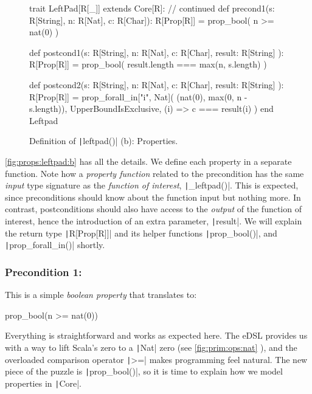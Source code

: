 \documentclass[11pt]{article}
\renewcommand{\vref}[1]{\autoref{#1} \vpageref{#1}}{}
\newcommand{\ScalaI}[1]{\texttt|#1|}
\begin{document}
\begin{figure}[tb]
\begin{ScalaBlock}
trait LeftPad[R[_]] extends Core[R]:
  // continued
  def precond1(s: R[String], n: R[Nat], c: R[Char]): R[Prop[R]] =
    prop_bool( n >= nat(0) )
  
  def postcond1(s: R[String], n: R[Nat], c: R[Char],
    result: R[String]
  ): R[Prop[R]] =
    prop_bool( result.length === max(n, s.length) )
  
  def postcond2(s: R[String], n: R[Nat], c: R[Char],
    result: R[String]
  ): R[Prop[R]] =
    prop_forall_in["i", Nat](
      (nat(0), max(0, n - s.length)),
      UpperBoundIsExclusive,
      (i) => c === result(i)
    )
end Leftpad
\end{ScalaBlock}
\caption{Definition of \ScalaI{leftpad()} (b): Properties.}
\label{fig:props:leftpad:b}
\hrulefill
\end{figure}


\vref{fig:props:leftpad:b} has all the details. We define each property in a separate function. Note how a \textit{property function} related to the precondition has the same \textit{input} type signature as the \textit{function of interest}, \ScalaI{_leftpad()}. This is expected, since preconditions should know about the function input but nothing more. In contrast, postconditions should also have access to the \textit{output} of the function of interest, hence the introduction of an extra parameter, \ScalaI{result}. We will explain the return type \ScalaI{R[Prop[R]]} and its helper functions \ScalaI{prop_bool()}, and \ScalaI{prop_forall_in()} shortly.

\subsubsection*{Precondition 1: \leftpadprea}
\noindent This is a simple \textit{boolean property} that translates to:

\begin{ScalaBlockSimple}
prop_bool(n >= nat(0))
\end{ScalaBlockSimple}

\noindent Everything is straightforward and works as expected here. The eDSL provides us with a way to lift Scala's zero to a \ScalaI{Nat} zero (see \vref{fig:prim:ops:nat}), and the overloaded comparison operator \ScalaI{>=} makes programming feel natural. The new piece of the puzzle is \ScalaI{prop_bool()}, so it is time to explain how we model properties in \ScalaI{Core}.
\end{document}
